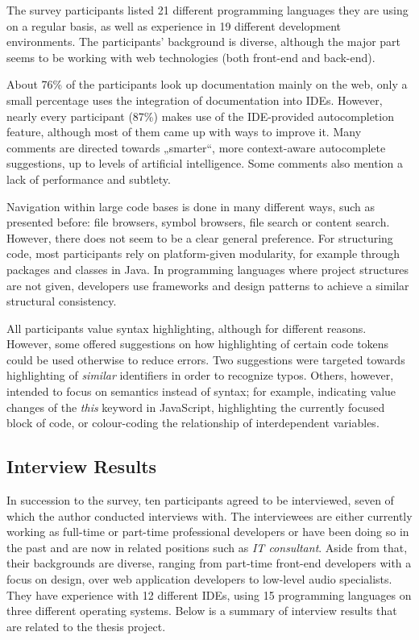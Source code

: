 The survey participants listed 21 different programming languages they
are using on a regular basis, as well as experience in 19 different
development environments. The participants’ background is diverse,
although the major part seems to be working with web technologies (both
front-end and back-end).

About 76\% of the participants look up documentation mainly on the web,
only a small percentage uses the integration of documentation into IDEs.
However, nearly every participant (87\%) makes use of the IDE-provided
autocompletion feature, although most of them came up with ways to
improve it. Many comments are directed towards „smarter“, more
context-aware autocomplete suggestions, up to levels of artificial
intelligence. Some comments also mention a lack of performance and
subtlety.

Navigation within large code bases is done in many different ways, such
as presented before: file browsers, symbol browsers, file search or
content search. However, there does not seem to be a clear general
preference. For structuring code, most participants rely on
platform-given modularity, for example through packages and classes in
Java. In programming languages where project structures are not given,
developers use frameworks and design patterns to achieve a similar
structural consistency.

All participants value syntax highlighting, although for different
reasons. However, some offered suggestions on how highlighting of
certain code tokens could be used otherwise to reduce errors. Two
suggestions were targeted towards highlighting of \emph{similar}
identifiers in order to recognize typos. Others, however, intended to
focus on semantics instead of syntax; for example, indicating value
changes of the \emph{this} keyword in JavaScript, highlighting the
currently focused block of code, or colour-coding the relationship of
interdependent variables.

\subsection{Interview Results}\label{interview-results}

In succession to the survey, ten participants agreed to be interviewed,
seven of which the author conducted interviews with. The interviewees
are either currently working as full-time or part-time professional
developers or have been doing so in the past and are now in related
positions such as \emph{IT consultant}. Aside from that, their
backgrounds are diverse, ranging from part-time front-end developers
with a focus on design, over web application developers to low-level
audio specialists. They have experience with 12 different IDEs, using 15
programming languages on three different operating systems. Below is a
summary of interview results that are related to the thesis project.

